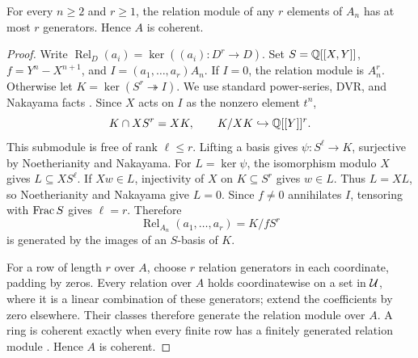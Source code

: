 \begin{lemma}\label{lem:uniform}
For every $n\geq2$ and $r\geq1$, the relation module of any $r$
elements of $A_n$ has at most $r$ generators. Hence $A$ is coherent.
\end{lemma}
\begin{proof}
Write $\operatorname{Rel}_D(a_i)=\ker((a_i):D^r\to D)$.
Set $S=\mathbb Q[[X,Y]]$, $f=Y^n-X^{n+1}$, and
$I=(a_1,\ldots,a_r)A_n$. If $I=0$, the relation module is $A_n^r$.
Otherwise let $K=\ker(S^r\twoheadrightarrow I)$.
We use standard power-series, DVR, and Nakayama facts
\cite[Tags~0306, 0AUW, 00DV]{StacksProject}.
Since $X$ acts on $I$ as the nonzero element $t^n$,
\[
 K\cap XS^r=XK,\qquad K/XK\hookrightarrow\mathbb Q[[Y]]^r.
\]
This submodule is free of rank $\ell\leq r$. Lifting a basis gives
$\psi:S^\ell\to K$, surjective by Noetherianity and Nakayama.
For $L=\ker\psi$, the isomorphism modulo $X$ gives $L\subseteq XS^\ell$.
If $Xw\in L$, injectivity of $X$ on $K\subseteq S^r$ gives $w\in L$.
Thus $L=XL$, so Noetherianity and Nakayama give $L=0$.
Since $f\ne0$ annihilates $I$, tensoring with $\operatorname{Frac} S$ gives
$\ell=r$. Therefore
\[
 \operatorname{Rel}_{A_n}(a_1,\ldots,a_r)=K/fS^r
\]
is generated by the images of an $S$-basis of $K$.

For a row of length $r$ over $A$, choose $r$ relation generators in
each coordinate, padding by zeros. Every relation over $A$ holds
coordinatewise on a set in $\mathcal U$, where it is a linear combination
of these generators; extend the coefficients by zero elsewhere.
Their classes therefore generate the relation module over $A$.
A ring is coherent exactly when every finite row has a finitely
generated relation module
\cite[\S10.90]{StacksProject}. Hence $A$ is coherent.
\end{proof}

